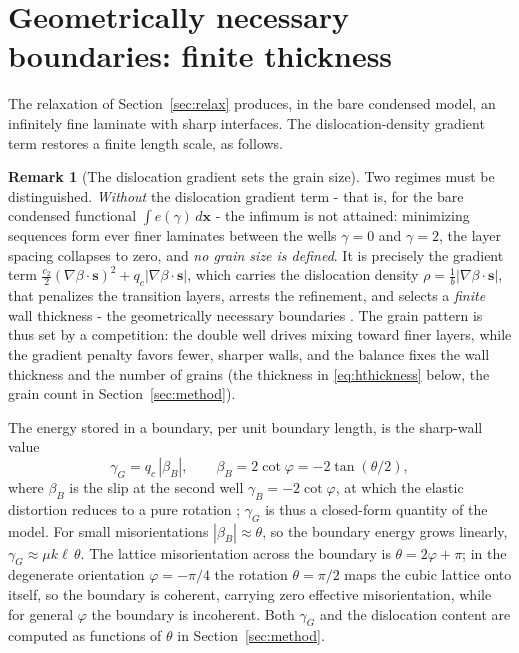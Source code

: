 \documentclass[12pt]{article}
\theoremstyle{plain}
\theoremstyle{definition}
\newtheorem{remark}[theorem]{Remark}
\newcommand{\bs}{\bm{s}}
\newcommand{\bx}{\bm{x}}
\begin{document}
\section{Geometrically necessary boundaries: finite thickness}\label{sec:GNB}
The relaxation of Section~\ref{sec:relax} produces, in the bare condensed model,
an infinitely fine laminate with sharp interfaces. The dislocation-density
gradient term restores a finite length scale, as follows.

\begin{remark}[The dislocation gradient sets the grain size]\label{rem:micro}
Two regimes must be distinguished. \emph{Without} the dislocation gradient term -
that is, for the bare condensed functional $\int e(\gamma)\,d\bx$ - the infimum is
not attained: minimizing sequences form ever finer laminates between the wells
$\gamma=0$ and $\gamma=2$, the layer spacing collapses to zero, and \emph{no grain size is defined}. It is precisely the gradient term
$\tfrac{c_2}{2}(\nabla\beta\cdot\bs)^{2}+q_c|\nabla\beta\cdot\bs|$, which carries
the dislocation density $\rho=\tfrac1b|\nabla\beta\cdot\bs|$, that penalizes the
transition layers, arrests the refinement, and selects a \emph{finite} wall
thickness - the geometrically necessary boundaries \citep{koster2015bformation}. The grain pattern is thus set by a competition: the double well drives mixing toward
finer layers, while the gradient penalty favors fewer, sharper walls, and the
balance fixes the wall thickness and the number of grains (the thickness in
\eqref{eq:hthickness} below, the grain count in Section~\ref{sec:method}). 
\end{remark}

The energy stored in a boundary, per unit boundary length, is the sharp-wall
value
\begin{equation}\label{eq:gammaG}
  \gamma_G=q_c\,|\beta_B| ,\qquad
  \beta_B=2\cot\varphi=-2\tan(\theta/2),
\end{equation}
where $\beta_B$ is the slip at the second well $\gamma_B=-2\cot\varphi$, at which
the elastic distortion reduces to a pure rotation \citep{koster2015aformation};
$\gamma_G$ is thus a closed-form quantity of the model. For small misorientations
$|\beta_B|\approx\theta$, so the boundary energy grows linearly,
$\gamma_G\approx\mu k\ell\,\theta$. The lattice
misorientation across the boundary is $\theta=2\varphi+\pi$; in the degenerate
orientation $\varphi=-\pi/4$ the rotation $\theta=\pi/2$ maps the cubic lattice
onto itself, so the boundary is coherent, carrying zero effective
misorientation, while for general $\varphi$ the boundary is incoherent.
Both $\gamma_G$ and the dislocation content are computed as functions of $\theta$
in Section~\ref{sec:method}.
\end{document}
